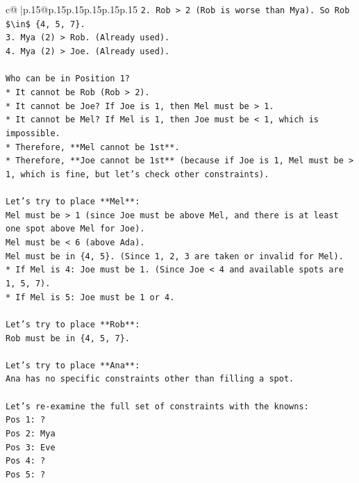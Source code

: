 \documentclass{article}
\begin{document}
{\begin{supertabular}{c@{$\;$}|p{.15\linewidth}@{}p{.15\linewidth}p{.15\linewidth}p{.15\linewidth}p{.15\linewidth}p{.15\linewidth}}
{{{\texttt{2.  Rob > 2 (Rob is worse than Mya). So Rob \$\textbackslash{}in\$ \{4, 5, 7\}.} \\
\texttt{3.  Mya (2) > Rob. (Already used).} \\
\texttt{4.  Mya (2) > Joe. (Already used).} \\
\\ 
\texttt{Who can be in Position 1?} \\
\texttt{*   It cannot be Rob (Rob > 2).} \\
\texttt{*   It cannot be Joe? If Joe is 1, then Mel must be > 1.} \\
\texttt{*   It cannot be Mel? If Mel is 1, then Joe must be < 1, which is impossible.} \\
\texttt{*   Therefore, **Mel cannot be 1st**.} \\
\texttt{*   Therefore, **Joe cannot be 1st** (because if Joe is 1, Mel must be > 1, which is fine, but let's check other constraints).} \\
\\ 
\texttt{Let's try to place **Mel**:} \\
\texttt{Mel must be > 1 (since Joe must be above Mel, and there is at least one spot above Mel for Joe).} \\
\texttt{Mel must be < 6 (above Ada).} \\
\texttt{Mel must be in \{4, 5\}. (Since 1, 2, 3 are taken or invalid for Mel).} \\
\texttt{*   If Mel is 4: Joe must be 1. (Since Joe < 4 and available spots are 1, 5, 7).} \\
\texttt{*   If Mel is 5: Joe must be 1 or 4.} \\
\\ 
\texttt{Let's try to place **Rob**:} \\
\texttt{Rob must be in \{4, 5, 7\}.} \\
\\ 
\texttt{Let's try to place **Ana**:} \\
\texttt{Ana has no specific constraints other than filling a spot.} \\
\\ 
\texttt{Let's re{-}examine the full set of constraints with the knowns:} \\
\texttt{Pos 1: ?} \\
\texttt{Pos 2: Mya} \\
\texttt{Pos 3: Eve} \\
\texttt{Pos 4: ?} \\
\texttt{Pos 5: ?} \\
}}}
\end{supertabular}}
\end{document}

